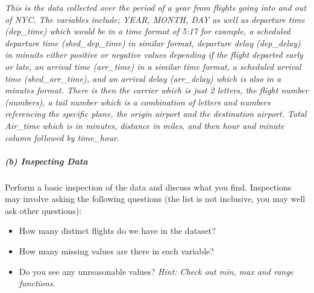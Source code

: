 \documentclass[
]{article}
\newenvironment{Shaded}{\begin{snugshade}}{\end{snugshade}}
\newcommand{\CommentTok}[1]{\textcolor[rgb]{0.56,0.35,0.01}{\textit{#1}}}
\newcommand{\KeywordTok}[1]{\textcolor[rgb]{0.13,0.29,0.53}{\textbf{#1}}}
\newcommand{\NormalTok}[1]{#1}
\newcommand{\OperatorTok}[1]{\textcolor[rgb]{0.81,0.36,0.00}{\textbf{#1}}}
\newcommand{\StringTok}[1]{\textcolor[rgb]{0.31,0.60,0.02}{#1}}
\providecommand{\tightlist}{%
  \setlength{\itemsep}{0pt}\setlength{\parskip}{0pt}}
\begin{document}
\emph{This is the data collected over the period of a year from flights
going into and out of NYC. The variables include; YEAR, MONTH, DAY as
well as departure time (dep\_time) which would be in a time format of
5:17 for example, a scheduled departure time (shed\_dep\_time) in
similar format, departure delay (dep\_delay) in minuits either positive
or negative values depending if the flight departed early or late, an
arrival time (arr\_time) in a similar time format, a scheduled arrival
time (shed\_arr\_time), and an arrival delay (arr\_delay) which is also
in a minutes format. There is then the carrier which is just 2 letters,
the flight number (numbers), a tail number which is a combination of
letters and numbers referencing the specific plane, the origin airport
and the destination airport. Total Air\_time which is in minutes,
distance in miles, and then hour and minute column followed by
time\_hour.}

\hypertarget{b-inspecting-data}{%
\subparagraph{(b) Inspecting Data}\label{b-inspecting-data}}

Perform a basic inspection of the data and discuss what you find.
Inspections may involve asking the following questions (the list is not
inclusive, you may well ask other questions):

\begin{itemize}
\tightlist
\item
  How many distinct flights do we have in the dataset?
\item
  How many missing values are there in each variable?
\item
  Do you see any unreasonable values? \emph{Hint: Check out min, max and
  range functions.}
\end{itemize}

\begin{Shaded}
\end{Shaded}
\end{document}
